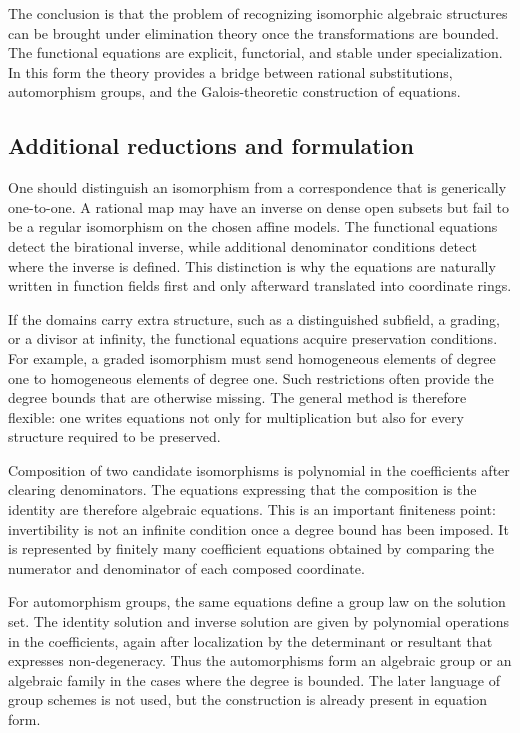 \documentclass[12pt]{article}
\begin{document}
The conclusion is that the problem of recognizing isomorphic algebraic structures can be brought
under elimination theory once the transformations are bounded. The functional equations are
explicit, functorial, and stable under specialization. In this form the theory provides a bridge
between rational substitutions, automorphism groups, and the Galois-theoretic construction of
equations.


\subsection{Additional reductions and formulation}

One should distinguish an isomorphism from a correspondence that is generically one-to-one. A
rational map may have an inverse on dense open subsets but fail to be a regular isomorphism on the
chosen affine models. The functional equations detect the birational inverse, while additional
denominator conditions detect where the inverse is defined. This distinction is why the equations
are naturally written in function fields first and only afterward translated into coordinate rings.

If the domains carry extra structure, such as a distinguished subfield, a grading, or a divisor at
infinity, the functional equations acquire preservation conditions. For example, a graded
isomorphism must send homogeneous elements of degree one to homogeneous elements of degree one. Such
restrictions often provide the degree bounds that are otherwise missing. The general method is
therefore flexible: one writes equations not only for multiplication but also for every structure
required to be preserved.

Composition of two candidate isomorphisms is polynomial in the coefficients after clearing
denominators. The equations expressing that the composition is the identity are therefore algebraic
equations. This is an important finiteness point: invertibility is not an infinite condition once a
degree bound has been imposed. It is represented by finitely many coefficient equations obtained by
comparing the numerator and denominator of each composed coordinate.

For automorphism groups, the same equations define a group law on the solution set. The identity
solution and inverse solution are given by polynomial operations in the coefficients, again after
localization by the determinant or resultant that expresses non-degeneracy. Thus the automorphisms
form an algebraic group or an algebraic family in the cases where the degree is bounded. The later
language of group schemes is not used, but the construction is already present in equation form.
\end{document}

